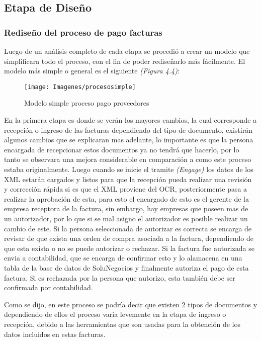 \subsection{Etapa de Diseño}

\subsubsection{Rediseño del proceso de pago facturas} 
Luego de un análisis completo de cada etapa se procedió a crear un modelo que simplificara todo el proceso, con el fin de poder rediseñarlo más fácilmente. El modelo más simple o general es el siguiente \textit{(Figura 4.4)}:
		
		\begin{figure}[H]
			\centering
			\texttt{[image: Imagenes/procesosimple]}
			\caption{Modelo simple proceso pago proveedores}
		\end{figure}
			
	En la primera etapa es donde se verán los mayores cambios, la cual corresponde a recepción o ingreso de las facturas dependiendo del tipo de documento, existirán algunos cambios que se explicaran mas adelante, lo importante es que la persona encargada de recepcionar estos documentos ya no tendrá que hacerlo, por lo tanto se observara una mejora considerable en comparación a como este proceso estaba originalmente. Luego cuando se inicie el tramite \textit{(Engage)} los datos de los XML estarán cargados y listos para que la recepción pueda realizar una revisión y corrección rápida si es que el XML proviene del OCR, posteriormente pasa a realizar la aprobación de esta, para esto el encargado de esto es el gerente de la empresa receptora de la factura, sin embargo, hay empresas que poseen mas de un autorizador, por lo que si se mal asigno el autorizador es posible realizar un cambio de este. Si la persona seleccionada de autorizar es correcta se encarga de revisar de que exista una orden de compra asociada a la factura, dependiendo de que esta exista o no se puede autorizar o rechazar. Si la factura fue autorizada se envia a contabilidad, que se encarga de confirmar esto y lo alamacena en una tabla de la base de datos de SoluNegocios y finalmente autoriza el pago de esta factura. Si es rechazada por la persona que autorizo, esta también debe ser confirmada por contabilidad.
	\newline
	\par
	Como se dijo, en este proceso se podría decir que existen 2 tipos de documentos y dependiendo de ellos el proceso varia levemente en la etapa de ingreso o recepción, debido a las herramientas que son usadas para la obtención de los datos incluidos en estas facturas.

